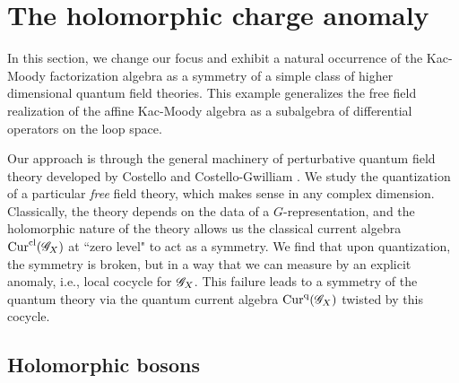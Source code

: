 \section{The holomorphic charge anomaly} \label{sec: qft}

In this section, we change our focus and exhibit a natural occurrence of the Kac-Moody factorization algebra as a symmetry of a simple class of higher dimensional quantum field theories. 
This example generalizes the free field realization of the affine Kac-Moody algebra as a subalgebra of differential operators on the loop space. 

Our approach is through the general machinery of perturbative quantum field theory developed by Costello \cite{CosRenorm} and Costello-Gwilliam \cite{CG1,CG2}.
We study the quantization of a particular {\em free} field theory, which makes sense in any complex dimension.
Classically, the theory depends on the data of a $G$-representation, and the holomorphic nature of the theory allows us the classical current algebra ${\rm Cur}^{{\rm cl}}(\mathscr G_X)$ at ``zero level" to act as a symmetry. 
We find that upon quantization, the symmetry is broken, but in a way that we can measure by an explicit anomaly, i.e., local cocycle for $\mathscr G_X$. 
This failure leads to a symmetry of the quantum theory via the quantum current algebra ${\rm Cur}^{{\rm q}}(\mathscr G_X)$ twisted by this cocycle.  
 
%
%
%

\subsection{Holomorphic bosons}

